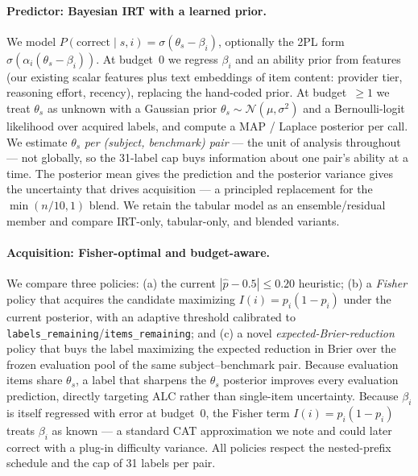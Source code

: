 \documentclass{article}
\begin{document}
\paragraph{Predictor: Bayesian IRT with a learned prior.} We model
$P(\text{correct} \mid s, i) = \sigma(\theta_s - \beta_i)$, optionally the 2PL
form $\sigma(\alpha_i(\theta_s - \beta_i))$. At budget~0 we regress $\beta_i$ and
an ability prior from features (our existing scalar features plus text embeddings
of item content: provider tier, reasoning effort, recency), replacing the
hand-coded prior. At budget~$\ge 1$ we treat $\theta_s$ as unknown with a Gaussian
prior $\theta_s \sim \mathcal{N}(\mu,\sigma^2)$ and a Bernoulli-logit likelihood
over acquired labels, and compute a MAP / Laplace posterior per call. We estimate
$\theta_s$ \emph{per (subject, benchmark) pair} --- the unit of analysis
throughout --- not globally, so the 31-label cap buys information about one pair's
ability at a time. The posterior mean gives the prediction and the posterior
variance gives the
uncertainty that drives acquisition --- a principled replacement for the
$\min(n/10,1)$ blend. We retain the tabular model as an ensemble/residual member
and compare IRT-only, tabular-only, and blended variants.

\paragraph{Acquisition: Fisher-optimal and budget-aware.} We compare three
policies: (a) the current $|\hat p - 0.5|\le 0.20$ heuristic; (b) a
\emph{Fisher} policy that acquires the candidate maximizing $I(i)=p_i(1-p_i)$
under the current posterior, with an adaptive threshold calibrated to
\texttt{labels\_remaining}/\texttt{items\_remaining}; and (c) a novel
\emph{expected-Brier-reduction} policy that buys the label maximizing the expected
reduction in Brier over the frozen evaluation pool of the same subject--benchmark
pair. Because evaluation items share $\theta_s$, a label that sharpens the
$\theta_s$ posterior improves every evaluation prediction, directly targeting ALC
rather than single-item uncertainty. Because $\beta_i$ is itself regressed with
error at budget~0, the Fisher term $I(i)=p_i(1-p_i)$ treats $\beta_i$ as known ---
a standard CAT approximation we note and could later correct with a plug-in
difficulty variance. All policies respect the nested-prefix
schedule and the cap of 31 labels per pair.
\end{document}
